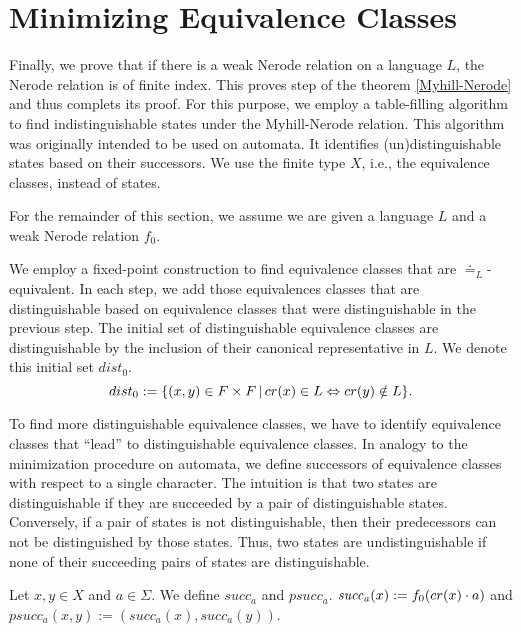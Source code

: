 \section{Minimizing Equivalence Classes}
Finally, we prove that if there is a weak Nerode relation on a language $L$, the Nerode relation is of finite index.
This proves step  of the theorem \ref{Myhill-Nerode} and thus complets its proof.
For this purpose, we employ a table-filling algorithm \cite{Huffman1954161} to find indistinguishable states under the Myhill-Nerode relation. 
This algorithm was originally intended to be used on automata. 
It identifies (un)distinguishable states based on their successors.
We use the finite type $X$, i.e., the equivalence classes, instead of states.


For the remainder of this section, we assume we are given a language $L$ and a weak Nerode relation $f_0$. 


We employ a fixed-point construction to find equivalence classes that are $\doteq_L$-equivalent.
In each step, we add those equivalences classes that are distinguishable based on equivalence classes that were distinguishable in the previous step.
The initial set of distinguishable equivalence classes are distinguishable by the inclusion of their canonical representative in $L$. 
We denote this initial set $\mathit{dist_0}$.
\begin{equation*}
    dist_0 := \{ (x,y)  \in F \times F \, | \, cr(x) \in L \Leftrightarrow cr(y) \notin L\}.
\end{equation*}



To find more distinguishable equivalence classes, we have to identify equivalence classes that ``lead'' to distinguishable equivalence classes. 
In analogy to the minimization procedure on automata, we define successors of equivalence classes with respect to a single character.
The intuition is that two states are distinguishable if they are succeeded by a pair of distinguishable states.
Conversely, if a pair of states is not distinguishable, then their predecessors can not be distinguished by those states.
Thus, two states are undistinguishable if none of their succeeding pairs of states are distinguishable.


\begin{definition}
    Let $x,y \in X$ and $a \in \Sigma$.
    We define $\mathit{succ_a}$ and $\mathit{psucc_a}$. $\mathit{succ_a}(x) := {f_0}(cr(x)\cdot a)$ and $\mathit{psucc_a}(x,y) := (\mathit{succ_a}(x), \mathit{succ_a}(y))$.
\end{definition}

